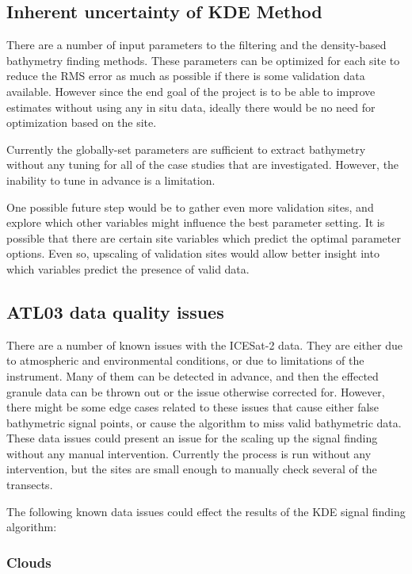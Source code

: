 \subsection{Inherent uncertainty of KDE Method}
There are a number of input parameters to the filtering and the density-based bathymetry finding methods. These parameters can be optimized for each site to reduce the RMS error as much as possible if there is some validation data available. However since the end goal of the project is to be able to improve estimates without using any in situ data, ideally there would be no need for optimization based on the site.

Currently the globally-set parameters are sufficient to extract bathymetry without any tuning for all of the case studies that are investigated. However, the inability to tune in advance is a limitation. 

One possible future step would be to gather even more validation sites, and explore which other variables might influence the best parameter setting. It is possible that there are certain site variables which predict the optimal parameter options. Even so, upscaling of validation sites would allow better insight into which variables predict the presence of valid data.  

\subsection{ATL03 data quality issues}\label{sec:discussion-photon-issues}

There are a number of known issues with the ICESat-2 data. They are either due to atmospheric and environmental conditions, or due to limitations of the instrument. Many of them can be detected in advance, and then the effected granule data can be thrown out or the issue otherwise corrected for. However, there might be some edge cases related to these issues that cause either false bathymetric signal points, or cause the algorithm to miss valid bathymetric data. These data issues could present an issue for the scaling up the signal finding without any manual intervention. Currently the process is run without any intervention, but the sites are small enough to manually check several of the transects.

The following known data issues could effect the results of the KDE signal finding algorithm:

\subsubsection{Clouds}

